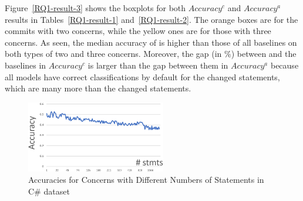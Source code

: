 
Figure~\ref{RQ1-result-3} shows the boxplots for both $Accuracy^c$ and
$Accuracy^a$ results in Tables~\ref{RQ1-result-1}
and~\ref{RQ1-result-2}. The orange boxes are for the commits with two
concerns, while the yellow ones are for those with three concerns. As
seen, the median accuracy of {\tool} is higher than those of all
baselines on both types of two and three concerns. Moreover, the gap
(in \%) between {\tool} and the baselines in $Accuracy^{c}$ is larger
than the gap between them in $Accuracy^{a}$ because all models have
correct classifications by default for the changed statements, which
are many more than the changed statements.


\begin{figure}[t]
	\centering \includegraphics[width=2.4in]{figures/accuracy-concerns-2.png}
	\vspace{-6pt}
	\caption{Accuracies for Concerns with Different Numbers of Statements in C\# dataset}
	\label{acc-concerns}
\end{figure}

